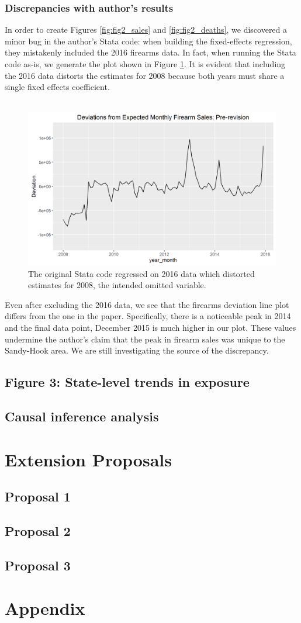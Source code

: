 \documentclass[12pt]{article}%
\begin{document}
\subsubsection*{Discrepancies with author's results}
In order to create Figures \ref{fig:fig2_sales} and \ref{fig:fig2_deaths}, we discovered a minor bug in the author's Stata code: when building the fixed-effects regression, they mistakenly included the 2016 firearms data. In fact, when running the Stata code as-is, we generate the plot shown in Figure \ref{fig:fig2_pre_revision}. It is evident that including the 2016 data distorts the estimates for 2008 because both years must share a single fixed effects coefficient. \\ \\
\begin{figure}[hbt]
	\centering
	\includegraphics[width=0.75\linewidth]{figures/fig2_pre_revision.png}
	\caption{The original Stata code regressed on 2016 data which distorted estimates for 2008, the intended omitted variable.}
	\label{fig:fig2_pre_revision}
\end{figure}
Even after excluding the 2016 data, we see that the firearms deviation line plot differs from the one in the paper. Specifically, there is a noticeable peak in 2014 and the final data point, December 2015 is much higher in our plot. These values undermine the author's claim that the peak in firearm sales was unique to the Sandy-Hook area. We are still investigating the source of the discrepancy. 
\subsection*{Figure 3: State-level trends in exposure}
\subsection*{Causal inference analysis}
\section*{Extension Proposals} 
\subsection*{Proposal 1}
\subsection*{Proposal 2}
\subsection*{Proposal 3}



\section*{Appendix}
\end{document}
